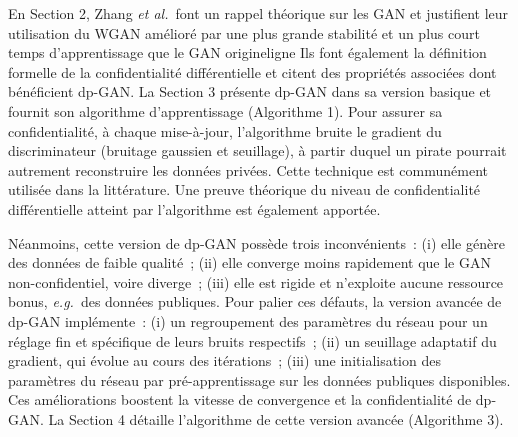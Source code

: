 \documentclass[a4paper,11pt,twoside]{article}
\theoremstyle{definition}
\newcommand{\eg}{\textit{e.g.}}
\newcommand{\etal}{\textit{et al.}}
\begin{document}
En Section 2, Zhang \etal\ font un rappel théorique sur les GAN et justifient leur utilisation du WGAN amélioré par une plus grande stabilité et un plus court temps d'apprentissage que le GAN origineligne Ils font également la définition formelle de la confidentialité différentielle et citent des propriétés associées dont bénéficient dp-GAN. La Section 3 présente dp-GAN dans sa version basique et fournit son algorithme d'apprentissage (Algorithme 1). Pour assurer sa confidentialité, à chaque mise-à-jour, l'algorithme bruite le gradient du discriminateur (bruitage gaussien et seuillage), à partir duquel un pirate pourrait autrement reconstruire les données privées. Cette technique est communément utilisée dans la littérature. Une preuve théorique du niveau de confidentialité différentielle atteint par l'algorithme est également apportée.

Néanmoins, cette version de dp-GAN possède trois inconvénients : (i) elle génère des données de faible qualité ; (ii) elle converge moins rapidement que le GAN non-confidentiel, voire diverge ; (iii) elle est rigide et n'exploite aucune ressource bonus, \eg\ des données publiques. Pour palier ces défauts, la version avancée de dp-GAN implémente : (i) un regroupement des paramètres du réseau pour un réglage fin et spécifique de leurs bruits respectifs ; (ii) un seuillage adaptatif du gradient, qui évolue au cours des itérations ; (iii) une initialisation des paramètres du réseau par pré-apprentissage sur les données publiques disponibles. Ces améliorations boostent la vitesse de convergence et la confidentialité de dp-GAN. La Section 4 détaille l'algorithme de  cette version avancée (Algorithme 3).
\end{document}
